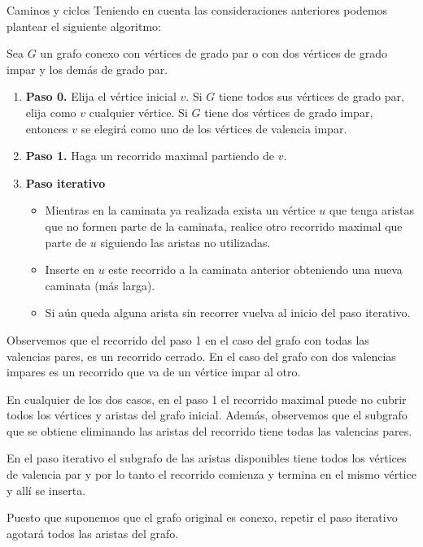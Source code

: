 \begin{section}{Caminos y ciclos}
Teniendo en cuenta las consideraciones anteriores podemos plantear el siguiente algoritmo:

Sea $G$ un grafo conexo con vértices de grado par o con dos vértices de grado impar y los demás de grado par. 

\begin{enumerate}
    \item \textbf{Paso 0.} Elija el vértice inicial $v$. Si $G$  tiene todos sus vértices de grado par,  elija como $v$ cualquier vértice. Si $G$ tiene dos vértices de grado impar,  entonces $v$ se elegirá como uno de los vértices de valencia impar.
    \item \textbf{Paso 1.} Haga un recorrido maximal partiendo de $v$. 
    
    \item \textbf{Paso iterativo} 
    \begin{itemize}
        \item Mientras en la caminata ya realizada exista un vértice $u$  que tenga aristas que no formen parte de la caminata, realice otro recorrido maximal que parte de $u$ siguiendo las aristas no utilizadas. 
        \item Inserte en $u$ este recorrido a la caminata  anterior obteniendo una nueva caminata (más larga).
        \item  Si aún queda alguna arista sin recorrer vuelva al inicio del paso iterativo.
    \end{itemize}
\end{enumerate}

Observemos que el recorrido del paso 1 en el caso del grafo con todas las valencias pares, es un recorrido cerrado. En el caso del grafo con dos valencias impares es un recorrido que va de un vértice impar al otro.  
    
En  cualquier de los dos casos,  en el paso 1 el recorrido maximal puede no cubrir todos los vértices y aristas del grafo inicial. Además,  observemos que el subgrafo que se obtiene eliminando las aristas del recorrido tiene todas las valencias pares. 

En  el paso iterativo el subgrafo de las aristas disponibles tiene todos los vértices de valencia par y por lo tanto el recorrido comienza y  termina en el mismo vértice y allí se inserta.

Puesto que suponemos que el grafo original es conexo, repetir el paso iterativo agotará todos las aristas del grafo.

\begin{comment}
El  algoritmo es el siguiente: 
\begin{enumerate}
    \item \textbf{Paso 1.} Elija cualquier vértice  inicial $v$ y haga una caminata  que no repita aristas y  que vuelva al vértice (de $v$ a $v$). 
    

\end{comment}
\end{section}
